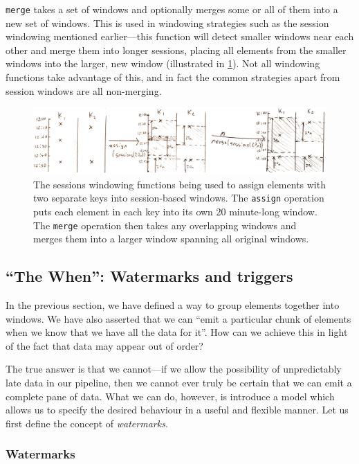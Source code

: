 \texttt{merge} takes a set of windows and optionally merges some or all of them into a new set of windows.
This is used in windowing strategies such as the session windowing mentioned earlier---this function will detect smaller windows near each other and merge them into longer sessions, placing all elements from the smaller windows into the larger, new window (illustrated in \cref{fig:prep:sessions-merge}).
Not all windowing functions take advantage of this, and in fact the common strategies apart from session windows are all non-merging.

\begin{figure}[t]
	\includegraphics[width=\textwidth]{images/temp/sessions-assign-merge}
	\caption{The sessions windowing functions being used to assign elements with two separate keys into session-based windows. The \texttt{assign} operation puts each element in each key into its own 20 minute-long window. The \texttt{merge} operation then takes any overlapping windows and merges them into a larger window spanning all original windows.}
	\label{fig:prep:sessions-merge}
\end{figure}


\subsection{``The When'': Watermarks and triggers}\label{sec:prep:dataflow:when}

In the previous section, we have defined a way to group elements together into windows.
We have also asserted that we can ``emit a particular chunk of elements when we know that we have all the data for it''.
How can we achieve this in light of the fact that data may appear out of order?

The true answer is that we cannot---if we allow the possibility of unpredictably late data in our pipeline, then we cannot ever truly be certain that we can emit a complete pane of data.
What we can do, however, is introduce a model which allows us to specify the desired behaviour in a useful and flexible manner.
Let us first define the concept of \emph{watermarks}.

\subsubsection{Watermarks}

